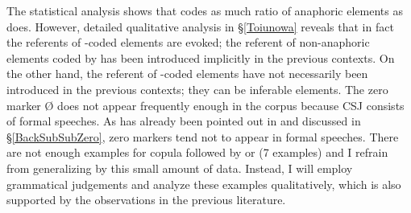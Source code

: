 The statistical analysis shows that
 codes as much ratio of anaphoric elements as  does.
However, detailed qualitative analysis in \S \ref{Toiunowa} reveals that
in fact the referents of -coded elements are evoked;
the referent of non-anaphoric elements coded by  has been introduced implicitly in the previous contexts.
On the other hand,
the referent of -coded elements have not necessarily been introduced in the previous contexts;
they can be inferable elements.
The zero marker {\O} does not appear frequently enough in the corpus because CSJ consists of formal speeches.
As has already been pointed out in  and discussed in \S \ref{BackSubSubZero},
zero markers tend not to appear in formal speeches.
There are not enough examples for copula followed by  or  (7 examples)
and I refrain from generalizing by this small amount of data.
Instead,
I will employ grammatical judgements and analyze these examples qualitatively,
which is also supported by the observations in the previous literature.


